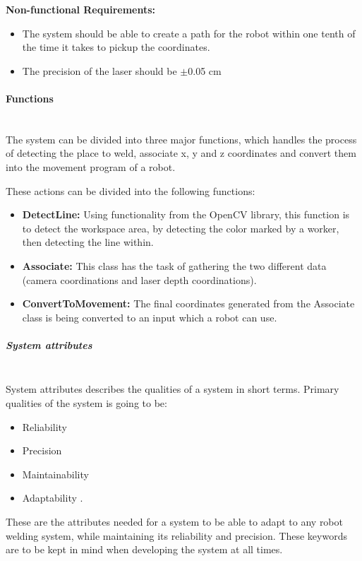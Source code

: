 \textbf{Non-functional Requirements:}

\begin{itemize}

\item The system should be able to create a path for the robot within one tenth of the time it takes to pickup the coordinates.
\item The precision of the laser should be $\pm$0.05 cm

\end{itemize}

\paragraph*{Functions}~\\

The system can be divided into three major functions, which handles the process of detecting the place to weld, associate x, y and z coordinates and convert them into the movement program of a robot.

These actions can be divided into the following functions:

\begin{itemize}

\item \textbf{DetectLine:} Using functionality from the OpenCV library, this function is to detect the workspace area, by detecting the color marked by a worker, then detecting the line within.
\item \textbf{Associate:} This class has the task of gathering the two different data (camera coordinations and laser depth coordinations).
\item \textbf{ConvertToMovement:} The final coordinates generated from the Associate class is being converted to an input which a robot can use. 

\end{itemize}

\subparagraph*{System attributes}~\\
System attributes describes the qualities of a system in short terms. Primary qualities of the system is going to be:

\begin{itemize}

\item Reliability
\item Precision
\item Maintainability
\item Adaptability
. 
\end{itemize}
These are the attributes needed for a system to be able to adapt to any robot welding system, while maintaining its reliability and precision. These keywords are to be kept in mind when developing the system at all times.

